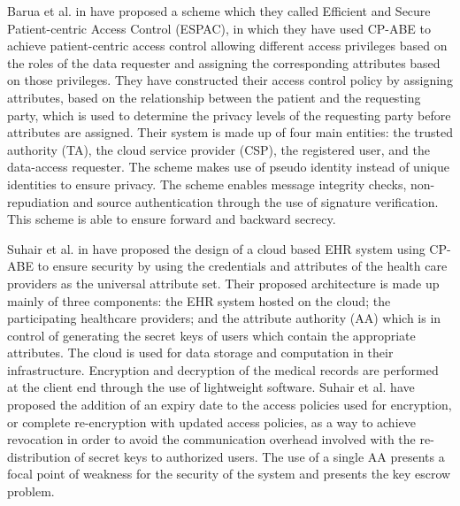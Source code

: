 Barua et al. in \cite{Barua2011} have proposed a scheme which they called Efficient and Secure Patient-centric Access Control (ESPAC), in which they have used CP-ABE to achieve patient-centric access control allowing different access privileges based on the roles of the data requester and assigning the corresponding attributes based on those privileges. They have constructed their access control policy by assigning attributes, based on the relationship between the patient and the requesting party, which is used to determine the privacy levels of the requesting party before attributes are assigned. Their system is made up of four main entities: the trusted authority (TA), the cloud service provider (CSP), the registered user, and the data-access requester. The scheme makes use of pseudo identity instead of unique identities to ensure privacy. The scheme enables message integrity checks, non-repudiation and source authentication through the use of signature verification. This scheme is able to ensure forward and backward secrecy.

Suhair et al. in \cite{Alshehri} have proposed the design of a cloud based EHR system using CP-ABE to ensure security by using the credentials and attributes of the health care providers as the universal attribute set. Their proposed architecture is made up mainly of three components: the EHR system hosted on the cloud; the participating healthcare providers; and the attribute authority (AA) which is in control of generating the secret keys of users which contain the appropriate attributes. The cloud is used for data storage and computation in their infrastructure. Encryption and decryption of the medical records are performed at the client end through the use of lightweight software. Suhair et al. have proposed the addition of an expiry date to the access policies used for encryption, or complete re-encryption with updated access policies, as a way to achieve revocation in order to avoid the communication overhead involved with the re-distribution of secret keys to authorized users. The use of a single AA presents a focal point of weakness for the security of the system and presents the key escrow problem.

